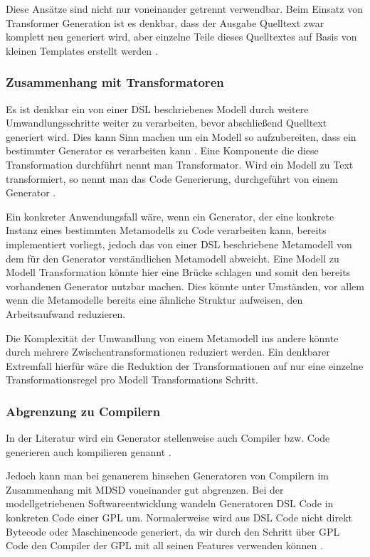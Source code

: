\documentclass[12pt,oneside,a4paper,parskip]{scrbook}
\begin{document}
Diese Ansätze sind nicht nur voneinander getrennt verwendbar. Beim Einsatz von Transformer Generation ist es denkbar, dass der Ausgabe Quelltext zwar komplett neu generiert wird, aber einzelne Teile dieses Quelltextes auf Basis von kleinen Templates erstellt werden \cite[S. 125]{fowler2010}.

\subsubsection{Zusammenhang mit Transformatoren}

Es ist denkbar ein von einer DSL beschriebenes Modell durch weitere Umwandlungsschritte weiter zu verarbeiten, bevor abschließend Quelltext generiert wird. Dies kann Sinn machen um ein Modell so aufzubereiten, dass ein bestimmter Generator es verarbeiten kann \cite[S. 195]{stahl2007}. Eine Komponente die diese Transformation durchführt nennt man Transformator. Wird ein Modell zu Text transformiert, so nennt man das Code Generierung, durchgeführt von einem Generator \cite[S. 271]{voelter2013}.

Ein konkreter Anwendungsfall wäre, wenn ein Generator, der eine konkrete Instanz eines bestimmten Metamodells zu Code verarbeiten kann, bereits implementiert vorliegt, jedoch das von einer DSL beschriebene Metamodell von dem für den Generator verständlichen Metamodell abweicht. Eine Modell zu Modell Transformation könnte hier eine Brücke schlagen und somit den bereits vorhandenen Generator nutzbar machen. Dies könnte unter Umständen, vor allem wenn die Metamodelle bereits eine ähnliche Struktur aufweisen, den Arbeitsaufwand reduzieren.

Die Komplexität der Umwandlung von einem Metamodell ins andere könnte durch mehrere Zwischentransformationen reduziert werden. Ein denkbarer Extremfall hierfür wäre die Reduktion der Transformationen auf nur eine einzelne Transformationsregel pro Modell Transformations Schritt.

\subsubsection{Abgrenzung zu Compilern}

In der Literatur wird ein Generator stellenweise auch Compiler \cite[S. 26]{voelter2013} bzw. Code generieren auch kompilieren genannt \cite[S. 19]{fowler2010}.

Jedoch kann man bei genauerem hinsehen Generatoren von Compilern im Zusammenhang mit MDSD voneinander gut abgrenzen. Bei der modellgetriebenen Softwareentwicklung wandeln Generatoren DSL Code in konkreten Code einer GPL um. Normalerweise wird aus DSL Code nicht direkt Bytecode oder Maschinencode generiert, da wir durch den Schritt über GPL Code den Compiler der GPL mit all seinen Features verwenden können \cite[S. 11]{voelter2013}.
	
\end{document}
